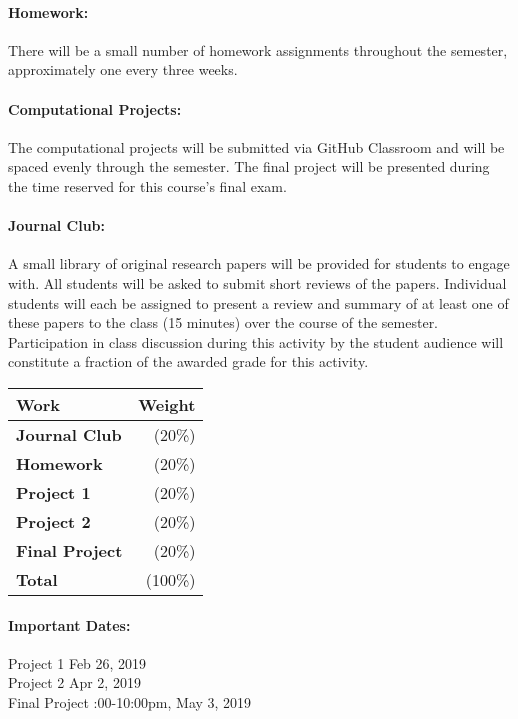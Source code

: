 \documentclass[11pt]{article}
\begin{document}
\paragraph{Homework:} There will be a small number of homework assignments 
throughout the semester, approximately one every three weeks.

\paragraph{Computational Projects:} The computational projects will be 
submitted via GitHub Classroom and will be spaced evenly through the semester. 
The final project will be presented during the time reserved for this course's 
final exam.

\paragraph{Journal Club:} A small library of original research papers will be 
provided for students to engage with. All students will be asked to submit 
short reviews of the papers. Individual students will each be assigned to 
present a review and summary of at least one of these papers to the class (15 
minutes) over the course of the semester.  Participation in class discussion 
during this activity by the student audience will constitute a fraction of the 
awarded grade for this activity.

\begin{table}[h]
\begin{tabularx}{\textwidth}{Xr}
        \textbf{Work} & \textbf{Weight} \\
\hline
\textbf{Journal Club}    & (20\%)  \\
\textbf{Homework}    & (20\%)  \\
\textbf{Project 1}    & (20\%)  \\
\textbf{Project 2}    & (20\%)  \\
\textbf{Final Project}  & (20\%)  \\
\hline
\textbf{Total}       & (100\%)\\
\end{tabularx}
\end{table}

\paragraph{Important Dates:}
\begin{center} \begin{minipage}{3.8in}
\begin{flushleft}
Project 1    \dotfill  Feb 26, 2019\\
Project 2  \dotfill  Apr 2, 2019\\
Final Project    :00-10:00pm, May 3, 2019\\
\end{flushleft}
\end{minipage}
\end{center}
\end{document}
